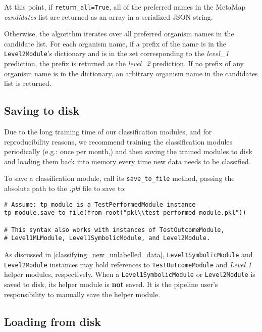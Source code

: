 \documentclass[a4paper]{article}
\begin{document}
At this point, if \lstinline{return_all=True}, all of the preferred names in the MetaMap \textit{candidates} list are returned as an array in a serialized JSON string.

Otherwise, the algorithm iterates over all preferred organism names in the candidate list. For each organism name, if a prefix of the name is in the \lstinline{Level2Module}'s dictionary and is in the set corresponding to the \textit{level\_1} prediction, the prefix is returned as the \textit{level\_2} prediction. If no prefix of any organism name is in the dictionary, an arbitrary organism name in the candidates list is returned.

\subsection{Saving to disk}

Due to the long training time of our classification modules, and for reproducibility reasons, we recommend training the classification modules periodically (e.g.: once per month,) and then saving the trained modules to disk and loading them back into memory every time new data needs to be classified.

To save a classification module, call its \lstinline{save_to_file} method, passing the absolute path to the \textit{.pkl} file to save to:

\lstset{language=Python}
\begin{lstlisting}
# Assume: tp_module is a TestPerformedModule instance
tp_module.save_to_file(from_root("pkl\\test_performed_module.pkl"))

# This syntax also works with instances of TestOutcomeModule,
# Level1MLModule, Level1SymbolicModule, and Level2Module.
\end{lstlisting}
\lstset{language=}

As discussed in \ref{classifying_new_unlabelled_data}, \lstinline{Level1SymbolicModule} and \lstinline{Level2Module} instances may hold references to \lstinline{TestOutcomeModule} and \textit{Level 1} helper modules, respectively. When a \lstinline{Level1SymbolicModule} or \lstinline{Level2Module} is saved to disk, its helper module is \textbf{not} saved. It is the pipeline user's responsibility to manually save the helper module.

\subsection{Loading from disk}
\end{document}

